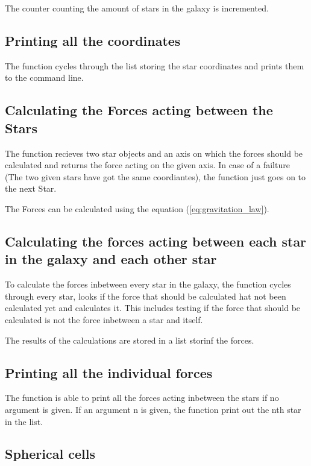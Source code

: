 The counter counting the amount of stars in the galaxy is incremented.

\subsection{Printing all the coordinates}

The function cycles through the list storing the star coordinates and prints
them to the command line.

\subsection{Calculating the Forces acting between the Stars}

The function recieves two star objects and an axis on which the forces should
be calculated and returns the force acting on the given axis. In case of a
failture (The two given stars have got the same coordiantes), the function
just goes on to the next Star.

The Forces can be calculated using the equation (\ref{eq:gravitation_law}).

\subsection{Calculating the forces acting between each star in the galaxy and
each other star}

To calculate the forces inbetween every star in the galaxy, the function cycles
through every star, looks if the force that should be calculated hat not been
calculated yet and calculates it. This includes testing if the force that should
be calculated is not the force inbetween a star and itself.

The results of the calculations are stored in a list storinf the forces.

\subsection{Printing all the individual forces}

The function is able to print all the forces acting inbetween the stars if no
argument is given. If an argument n is given, the function print out the nth
star in the list.

\subsection{Spherical cells}


